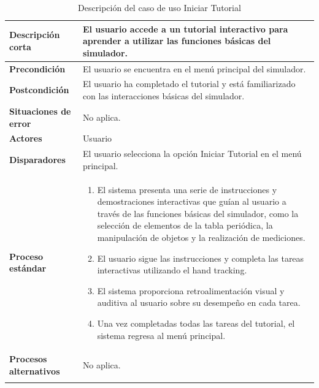 \begin{longtable}{>{\raggedright\arraybackslash}m{} >{\raggedright\arraybackslash}m{}}
    \textbf{Descripción corta} &El usuario accede a un tutorial interactivo para aprender a utilizar las funciones básicas del simulador. \\
    \midrule
    \textbf{Precondición} & El usuario se encuentra en el menú principal del simulador. \\
    \midrule
    \textbf{Postcondición} & El usuario ha completado el tutorial y está familiarizado con las interacciones básicas del simulador. \\
    \midrule
    \textbf{Situaciones de error} & No aplica.  \\
    \midrule
    \textbf{Actores} & Usuario \\
    \midrule
    \textbf{Disparadores} & El usuario selecciona la opción Iniciar Tutorial en el menú principal.\\
    \midrule
    \textbf{Proceso estándar} &
    \begin{enumerate}
        \item El sistema presenta una serie de instrucciones y demostraciones interactivas que guían al usuario a través de las funciones básicas del simulador, como la selección de elementos de la tabla periódica, la manipulación de objetos y la realización de mediciones. 
        \item El usuario sigue las instrucciones y completa las tareas interactivas utilizando el hand tracking. 
        \item El sistema proporciona retroalimentación visual y auditiva al usuario sobre su desempeño en cada tarea. 
        \item Una vez completadas todas las tareas del tutorial, el sistema regresa al menú principal.  
    \end{enumerate} \\
    \midrule
    \textbf{Procesos alternativos} & No aplica.\\
    \midrule
    \caption{Descripción del caso de uso Iniciar Tutorial}
    \label{tab:Caso_de_uso_Iniciar_Tutorial}
\end{longtable}


